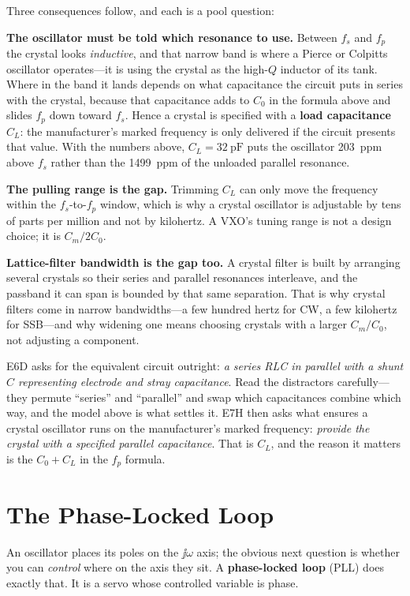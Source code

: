 Three consequences follow, and each is a pool question:

\textbf{The oscillator must be told which resonance to use.} Between \(f_s\) and
\(f_p\) the crystal looks \emph{inductive}, and that narrow band is where a
Pierce or Colpitts oscillator operates---it is using the crystal as the
high-\(Q\) inductor of its tank. Where in the band it lands depends on what
capacitance the circuit puts in series with the crystal, because that capacitance adds
to \(C_0\) in the formula above and slides \(f_p\) down toward \(f_s\). Hence a
crystal is specified with a \textbf{load capacitance} \(C_L\): the manufacturer's
marked frequency is only delivered if the circuit presents that value. With the
numbers above, \(C_L=\SI{32}{\pico\farad}\) puts the oscillator \SI{203}{ppm} above
\(f_s\) rather than the \SI{1499}{ppm} of the unloaded parallel resonance.

\textbf{The pulling range is the gap.} Trimming \(C_L\) can only move the frequency
within the \(f_s\)-to-\(f_p\) window, which is why a crystal oscillator is adjustable
by tens of parts per million and not by kilohertz. A VXO's tuning range is not a
design choice; it is \(C_m/2C_0\).

\textbf{Lattice-filter bandwidth is the gap too.} A crystal filter is built by
arranging several crystals so their series and parallel resonances interleave, and the
passband it can span is bounded by that same separation. That is why crystal filters
come in narrow bandwidths---a few hundred hertz for CW, a few kilohertz for SSB---and
why widening one means choosing crystals with a larger \(C_m/C_0\), not adjusting a
component.

\begin{exambox}
E6D asks for the equivalent circuit outright: \emph{a series RLC in parallel with a
shunt \(C\) representing electrode and stray capacitance}. Read the distractors
carefully---they permute ``series'' and ``parallel'' and swap which capacitances
combine which way, and the model above is what settles it. E7H then asks what ensures
a crystal oscillator runs on the manufacturer's marked frequency: \emph{provide the
crystal with a specified parallel capacitance}. That is \(C_L\), and the reason it
matters is the \(C_0+C_L\) in the \(f_p\) formula.
\end{exambox}

\section{The Phase-Locked Loop}
\label{sec:pll}
An oscillator places its poles on the \(\jj\omega\) axis; the obvious next question is
whether you can \emph{control} where on the axis they sit. A \textbf{phase-locked loop}
(PLL) does exactly that. It is a servo whose controlled variable is phase.


